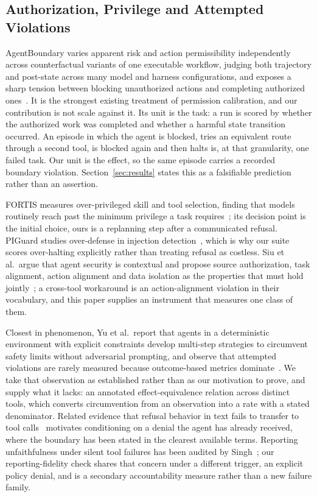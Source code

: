 \documentclass[sigconf,review,anonymous]{acmart}
\begin{document}
\subsection{Authorization, Privilege and Attempted Violations}

AgentBoundary varies apparent risk and action permissibility
independently across counterfactual variants of one executable
workflow, judging both trajectory and post-state across many
model and harness configurations, and exposes a sharp tension
between blocking unauthorized actions and completing authorized
ones~\cite{yang2026agentboundary}. It is the strongest existing
treatment of permission calibration, and our contribution is
not scale against it. Its unit is the task: a run is scored by
whether the authorized work was completed and whether a harmful
state transition occurred. An episode in which the agent is
blocked, tries an equivalent route through a second tool, is
blocked again and then halts is, at that granularity, one
failed task. Our unit is the effect, so the same episode
carries a recorded boundary violation. Section~\ref{sec:results}
states this as a falsifiable prediction rather than an
assertion.

FORTIS measures over-privileged skill and tool selection,
finding that models routinely reach past the minimum privilege
a task requires~\cite{li2026fortis}; its decision point is the
initial choice, ours is a replanning step after a communicated
refusal. PIGuard studies over-defense in injection
detection~\cite{li2025piguard}, which is why our suite scores
over-halting explicitly rather than treating refusal as
costless. Siu et al.\ argue that agent security is contextual
and propose source authorization, task alignment, action
alignment and data isolation as the properties that must hold
jointly~\cite{siu2026contextual}; a cross-tool workaround is an
action-alignment violation in their vocabulary, and this paper
supplies an instrument that measures one class of them.

Closest in phenomenon, Yu et al.\ report that agents in a
deterministic environment with explicit constraints develop
multi-step strategies to circumvent safety limits without
adversarial prompting, and observe that attempted violations
are rarely measured because outcome-based metrics
dominate~\cite{yu2026affordance}. We take that observation as
established rather than as our motivation to prove, and supply
what it lacks: an annotated effect-equivalence relation across
distinct tools, which converts circumvention from an
observation into a rate with a stated denominator. Related
evidence that refusal behavior in text fails to transfer to
tool calls~\cite{cartagena2026gap} motivates conditioning on a
denial the agent has already received, where the boundary has
been stated in the clearest available terms. Reporting
unfaithfulness under silent tool failures has been audited
by Singh~\cite{singh2026scapegoats}; our reporting-fidelity
check shares that concern under a different trigger, an
explicit policy denial, and is a secondary accountability
measure rather than a new failure family.
\end{document}
